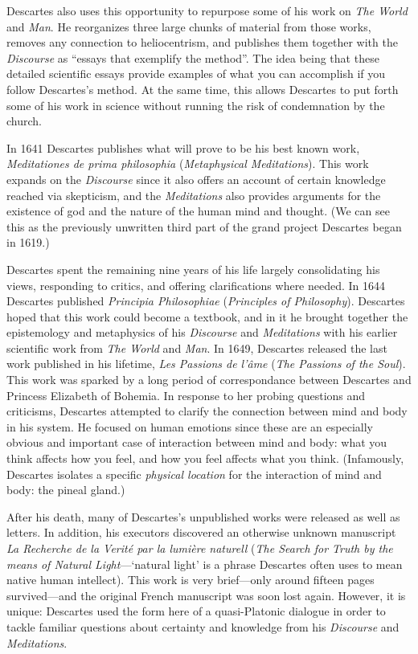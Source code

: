 Descartes also uses this opportunity to repurpose some of his work on \textit{The World} and \textit{Man}. He reorganizes three large chunks of material from those works, removes any connection to heliocentrism, and publishes them together with the \textit{Discourse} as ``essays that exemplify the method''. The idea being that these detailed scientific essays provide examples of what you can accomplish if you follow Descartes's method. At the same time, this allows Descartes to put forth some of his work in science without running the risk of condemnation by the church.

In 1641 Descartes publishes what will prove to be his best known work, \textit{Meditationes de prima philosophia} (\textit{Metaphysical Meditations}). This work expands on the \textit{Discourse} since it also offers an account of certain knowledge reached via skepticism, and the \textit{Meditations} also provides arguments for the existence of god and the nature of the human mind and thought. (We can see this as the previously unwritten third part of the grand project Descartes began in 1619.)

Descartes spent the remaining nine years of his life largely consolidating his views, responding to critics, and offering clarifications where needed. In 1644 Descartes published \textit{Principia Philosophiae} (\textit{Principles of Philosophy}). Descartes hoped that this work could become a textbook, and in it he brought together the epistemology and metaphysics of his \textit{Discourse} and \textit{Meditations} with his earlier scientific work from \textit{The World} and \textit{Man}. In 1649, Descartes released the last work published in his lifetime, \textit{Les Passions de l'âme} (\textit{The Passions of the Soul}). This work was sparked by a long period of correspondance between Descartes and Princess Elizabeth of Bohemia. In response to her probing questions and criticisms, Descartes attempted to clarify the connection between mind and body in his system. He focused on human emotions since these are an especially obvious and important case of interaction between mind and body: what you think affects how you feel, and how you feel affects what you think. (Infamously, Descartes isolates a specific \textit{physical location} for the interaction of mind and body: the pineal gland.)

After his death, many of Descartes's unpublished works were released as well as letters. In addition, his executors discovered an otherwise unknown manuscript \textit{La Recherche de la Verité par la lumière naturell} (\textit{The Search for Truth by the means of Natural Light}---`natural light' is a phrase Descartes often uses to mean native human intellect). This work is very brief---only around fifteen pages survived---and the original French manuscript was soon lost again. However, it is unique: Descartes used the form here of a quasi-Platonic dialogue in order to tackle familiar questions about certainty and knowledge from his \textit{Discourse} and \textit{Meditations}.


